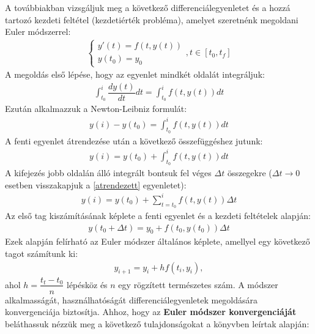 A továbbiakban vizsgáljuk meg a következő differenciálegyenletet és a hozzá tartozó kezdeti feltétel (kezdetiérték probléma), amelyet szeretnénk megoldani Euler módszerrel:
\begin{align}
	\begin{cases}
		y'(t) = f(t,y(t)) \\
		y(t_{0}) = y_{0}
	\end{cases}
	,t\in[t_{0}, t_{f}]
\end{align}
A megoldás első lépése, hogy az egyenlet mindkét oldalát integráljuk:
\begin{align}
	\int_{t_{0}}^{i} \dfrac{dy(t)}{dt} dt = \int_{t_{0}}^{i} f(t,y(t)) dt
\end{align}
Ezután alkalmazzuk a Newton-Leibniz formulát:
\begin{align}
	y(i)-y(t_{0}) = \int_{t_{0}}^{i} f(t,y(t)) dt
\end{align}
A fenti egyenlet átrendezése után a következő összefüggéshez jutunk:
\begin{align} \label{atrendezett}
	y(i) = y(t_{0}) + \int_{t_{0}}^{i} f(t,y(t)) dt
\end{align}
A kifejezés jobb oldalán álló integrált bontsuk fel véges $\Delta t$ összegekre ($\Delta t \to 0$ esetben visszakapjuk a \ref{atrendezett} egyenletet):
\begin{align}
	y(i) = y(t_{0}) + \sum_{t=t_{0}}^{i} f(t,y(t)) \Delta t
\end{align}
Az első tag kiszámításának képlete a fenti egyenlet és a kezdeti feltételek alapján:
\begin{align}
	y(t_{0}+ \Delta t) = y_{0} + f(t_{0},y(t_{0})) \Delta t
\end{align}
Ezek alapján felírható az Euler módszer általános képlete, amellyel egy következő tagot számítunk ki:
\begin{align} \label{eq:altalanosKeplet}
	y_{i+1} = y_{i} + hf(t_{i},y_{i}),
\end{align}
ahol $h = \dfrac{t_{t}-t_{0}}{n}$ lépésköz és $n$ egy rögzített természetes szám.
\newpage
A módszer alkalmasságát, használhatóságát differenciálegyenletek megoldására konvergenciája biztosítja. Ahhoz, hogy az \textbf{Euler módszer konvergenciáját} beláthassuk nézzük meg a következő tulajdonságokat a \cite{DiffEgyenletesKonyv} könyvben leírtak alapján:

